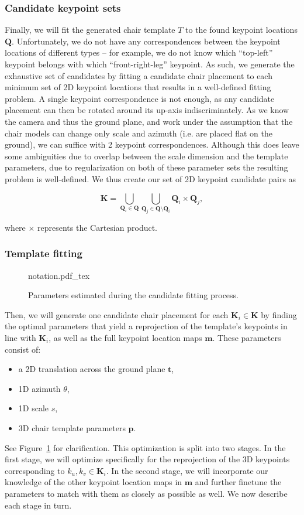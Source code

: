 \documentclass[10pt,twocolumn,letterpaper]{article}
\newcommand{\bb}[1]{{\bm{#1}}}
\begin{document}
\subsubsection{Candidate keypoint sets}
Finally, we will fit the generated chair template $T$ to the found keypoint
locations $\bb{Q}$.  Unfortunately, we do not have any correspondences between the
keypoint locations of different types -- for example, we do not know which
``top-left'' keypoint belongs with which ``front-right-leg'' keypoint.  As
such, we generate the exhaustive set of candidates by fitting a candidate chair
placement to each minimum set of 2D keypoint locations that results in a
well-defined fitting problem. A single keypoint correspondence is not enough,
as any candidate placement can then be rotated around its up-axis
indiscriminately. As we know the camera and thus the ground plane, and work
under the assumption that the chair models can change only scale and azimuth
(i.e. are placed flat on the ground), we can suffice with 2 keypoint
correspondences. Although this does leave some ambiguities due to overlap
between the scale dimension and the template parameters, due to regularization
on both of these parameter sets the resulting problem is well-defined. We thus
create our set of 2D keypoint candidate pairs as

\[ \bb{K} = \bigcup_{\bb{Q}_i \in \bb{Q}}\bigcup_{\bb{Q}_j \in \bb{Q}\setminus{}\bb{Q}_i} \bb{Q}_i \times \bb{Q}_j, \]

where $\times$ represents the Cartesian product.

\subsubsection{Template fitting}
\label{sssec:ch4:template_fitting}
\begin{figure}[h!t]
    \def\svgwidth{\linewidth}
    {notation.pdf_tex}
    \caption{Parameters estimated during the candidate fitting process.}
    \label{fig:ch4:fitting_parameters}
\end{figure}
Then, we will generate one candidate chair placement for each $\bb{K}_i \in \bb{K}$
by finding the optimal parameters that yield a reprojection of the template's keypoints in line with $\bb{K}_i$,
as well as the full keypoint location maps $\bb{m}$.
These parameters consist of:
\begin{itemize}
    \item a 2D translation across the ground plane $\bb{t}$,
    \item 1D azimuth $\theta$,
    \item 1D scale $s$,
    \item 3D chair template parameters $\bb{p}$.
\end{itemize}
See Figure~\ref{fig:ch4:fitting_parameters} for clarification.  This
optimization is split into two stages.  In the first stage, we will optimize
specifically for the reprojection of the 3D keypoints corresponding to $k_u,
k_v \in \bb{K}_i$.  In the second stage, we will incorporate our knowledge of
the other keypoint location maps in $\bb{m}$ and further finetune the
parameters to match with them as closely as possible as well.  We now describe
each stage in turn.
\end{document}
